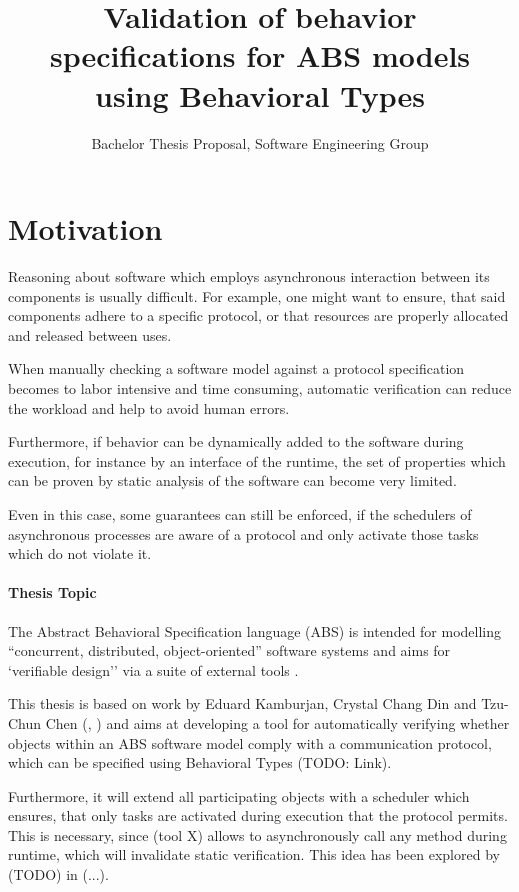 \documentclass[paper=a4,nochapname,accentcolor=tud9c]{tudexercise}
\title{Validation of behavior specifications for ABS models using Behavioral Types}
\subtitle{Bachelor Thesis Proposal, Software Engineering Group}
\begin{document}
%
\maketitle
%
\tableofcontents

\section{Motivation}
Reasoning about software which employs asynchronous interaction between its
components is usually difficult.
For example, one might want to ensure, that said components adhere to a specific
protocol, or that resources are properly allocated and released between uses.

When manually checking a software model against a protocol specification becomes
to labor intensive and time consuming, automatic verification can reduce the
workload and help to avoid human errors.

Furthermore, if behavior can be dynamically added to the software during execution,
for instance by an interface of the runtime, the set of properties which
can be proven by static analysis of the software can become very limited.

Even in this case, some guarantees can still be enforced, if the schedulers of
asynchronous processes are aware of a protocol and only activate those tasks
which do not violate it.

\paragraph{Thesis Topic}

The Abstract Behavioral Specification language (ABS) is intended for modelling
``concurrent, distributed, object-oriented'' software systems and
aims for `verifiable design'' via a suite of external tools \cite{absdesign}.

This thesis is based on work by Eduard Kamburjan, Crystal Chang Din and
Tzu-Chun Chen (\cite{kamburjan2018stateful}, \cite{kamburjan2016session}) and
aims at developing a tool for automatically verifying whether objects within an
ABS software model comply with a communication protocol, which can be specified
using Behavioral Types (TODO: Link).

Furthermore, it will extend all participating objects with a scheduler which
ensures, that only tasks are activated during execution that the protocol permits.
This is necessary, since (tool X) allows to asynchronously call any method during
runtime, which will invalidate static verification.
This idea has been explored by (TODO) in (...).
\end{document}
